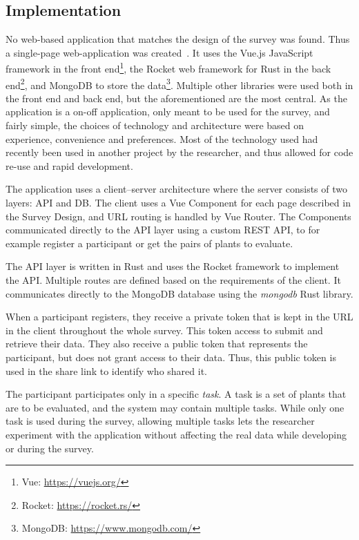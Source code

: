 \subsection{Implementation}
No web-based application that matches the design of the survey was found.
Thus a single-page web-application was created~\cite{CodePairwise}.
It uses the Vue.js JavaScript framework in the front end\footnote{Vue: \url{https://vuejs.org/}}, the Rocket web framework for Rust in the back end\footnote{Rocket: \url{https://rocket.rs/}}, and MongoDB to store the data\footnote{MongoDB: \url{https://www.mongodb.com/}}.
Multiple other libraries were used both in the front end and back end, but the aforementioned are the most central.
As the application is a on-off application, only meant to be used for the survey, and fairly simple, the choices of technology and architecture were based on experience, convenience and preferences.
Most of the technology used had recently been used in another project by the researcher, and thus allowed for code re-use and rapid development.

The application uses a client--server architecture where the server consists of two layers: API and DB.
The client uses a Vue Component for each page described in the Survey Design, and URL routing is handled by Vue Router.
The Components communicated directly to the API layer using a custom REST API, to for example register a participant or get the pairs of plants to evaluate.

The API layer is written in Rust and uses the Rocket framework to implement the API.
Multiple routes are defined based on the requirements of the client.
It communicates directly to the MongoDB database using the \textit{mongodb} Rust library.

When a participant registers, they receive a private token that is kept in the URL in the client throughout the whole survey.
This token access to submit and retrieve their data.
They also receive a public token that represents the participant, but does not grant access to their data.
Thus, this public token is used in the share link to identify who shared it.

The participant participates only in a specific \textit{task}.
A task is a set of plants that are to be evaluated, and the system may contain multiple tasks.
While only one task is used during the survey, allowing multiple tasks lets the researcher experiment with the application without affecting the real data while developing or during the survey.

